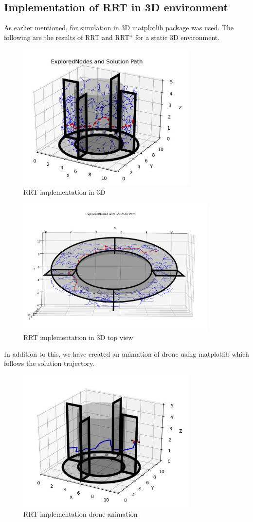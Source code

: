 \documentclass{IEEEtran}
\begin{document}
\subsection{\textbf{Implementation of RRT in 3D environment}}
As earlier mentioned, for simulation in 3D matplotlib package was used. The following are the results of RRT and RRT* for a static 3D environment.
\begin{figure}[h]
    \includegraphics[width=9cm]{rrt3d}
    \caption{RRT implementation in 3D}
    \label{fig:RRT implementation in 3D}
\end{figure} 
\newpage
\begin{figure}[h]
    \centering
    \includegraphics[width=10cm]{rrt3dtop}
    \caption{RRT implementation in 3D top view}
    \label{fig:RRT implementation in 3D top view}
\end{figure}
In addition to this, we have created an animation of drone using matplotlib which follows the solution trajectory.
 \begin{figure}[h]
    \centering
    \includegraphics[width=9cm]{rrt3ddrone}
    \caption{RRT implementation drone animation}
    \label{fig:RRT implementation drone animation}
\end{figure}
\end{document}
